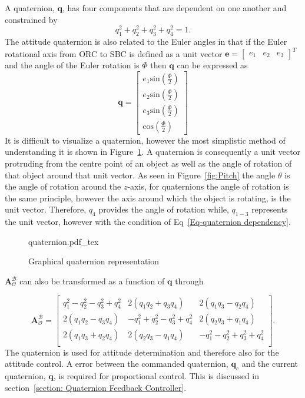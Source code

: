 A quaternion, $\mathbf{q}$, has four components that are dependent on one another and constrained by 
\begin{equation} 
\label{Eq-quaternion dependency}
q_1^2 + q_2^2 + q_3^2 + q_4^2 = 1.
\end{equation}
The attitude quaternion is also related to the Euler angles in that if the Euler rotational axis from ORC to SBC is defined as a unit vector $\mathbf{e} = \begin{bmatrix} e_1  & e_2 & e_3 \end{bmatrix}^T$ and the angle of the Euler rotation is $\Phi$ then $\mathbf{q}$ can be expressed as
\begin{equation}
\mathbf{q} = \begin{bmatrix} e_1 \text{sin}(\frac{\Phi}{2}) \\ e_2 \text{sin}(\frac{\Phi}{2}) \\ e_3 \text{sin}(\frac{\Phi}{2}) \\ \text{cos}(\frac{\Phi}{2}) \end{bmatrix}
\end{equation}
It is difficult to visualize a quaternion, however the most simplistic method of understanding it is shown in Figure~\ref{fig:quaternion}. A quaternion is consequently a unit vector protruding from the centre point of an object as well as the angle of rotation of that object around that unit vector. As seen in Figure~\ref{fig:Pitch} the angle $\theta$ is the angle of rotation around the $z$-axis, for quaternions the angle of rotation is the same principle, however the axis around which the object is rotating, is the unit vector. Therefore, $q_4$ provides the angle of rotation while, $q_{1-3}$ represents the unit vector, however with the condition of Eq~\ref{Eq-quaternion dependency}.

\begin{figure}[!htb]
	\centering
	\def\svgwidth{10cm}
	{quaternion.pdf_tex}
	\caption{Graphical quaternion representation}
	\label{fig:quaternion}
\end{figure}

$\boldsymbol{A}^{\mathcal{B}}_{\mathcal{O}}$ can also be transformed as a function of $\mathbf{q}$ \cite{wertz2012spacecraft} through

\begin{equation}
\label{eq:DCM_quaternion}
	\boldsymbol{A}^{\mathcal{B}}_{\mathcal{O}}
		= \begin{bmatrix}
		q_1^2 - q_2^2 - q_3^2 + q_4^2 & 2(q_1q_2 + q_3q_4) & 2(q_1q_3 - q_2q_4) \\
		2(q_1q_2 - q_3q_4) & -q_1^2 + q_2^2 - q_3^2 + q_4^2 & 2(q_2q_3 + q_1q_4) \\
		2(q_1q_3 + q_2q_4) & 2(q_2q_3 - q_1q_4) & -q_1^2 - q_2^2 + q_3^2 + q_4^2 \\
		\end{bmatrix}.
\end{equation}
The quaternion is used for attitude determination and therefore also for the attitude control. A error between the commanded quaternion, $\mathbf{q}_c$ and the current quaternion, $\mathbf{q}$, is required for proportional control. This is discussed in section~\ref{section: Quaternion Feedback Controller}.

